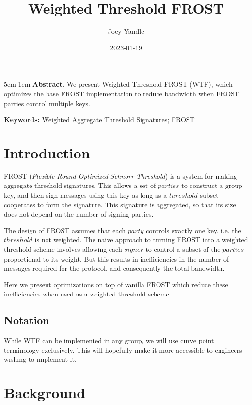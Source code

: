 \documentclass{article}
\title{Weighted Threshold FROST}
\date{2023-01-19}
\author{Joey Yandle}
\begin{document}
\onecolumn
\maketitle

\begingroup
\leftskip5em
\parskip1em
\rightskip\leftskip
\noindent\textbf{Abstract.} We present Weighted Threshold FROST (WTF), which optimizes the base FROST implementation to reduce bandwidth when FROST parties control multiple keys.

\par
\noindent\textbf{Keywords:} Weighted Aggregate Threshold Signatures; FROST
\par
\endgroup

\section{
  Introduction
}

FROST (\emph{Flexible Round-Optimized Schnorr Threshold}) \cite{frost} is a system for making aggregate threshold signatures.  This allows a set of $parties$ to construct a group key, and then sign messages using this key as long as a $threshold$ subset cooperates to form the signature.  This signature is aggregated, so that its size does not depend on the number of signing parties.

The design of FROST assumes that each $party$ controls exactly one key, i.e. the $threshold$ is not weighted.  The naive approach to turning FROST into a weighted threshold scheme involves allowing each $signer$ to control a subset of the $parties$ proportional to its weight.  But this results in inefficiencies in the number of messages required for the protocol, and consequently the total bandwidth.

Here we present optimizations on top of vanilla FROST which reduce these inefficiencies when used as a weighted threshold scheme.  

\subsection{
  Notation
}

While WTF can be implemented in any group, we will use curve point terminology exclusively.  This will hopefully make it more accessible to engineers wishing to implement it.


\newpage
\onecolumn
\section{
  Background
}
\end{document}
